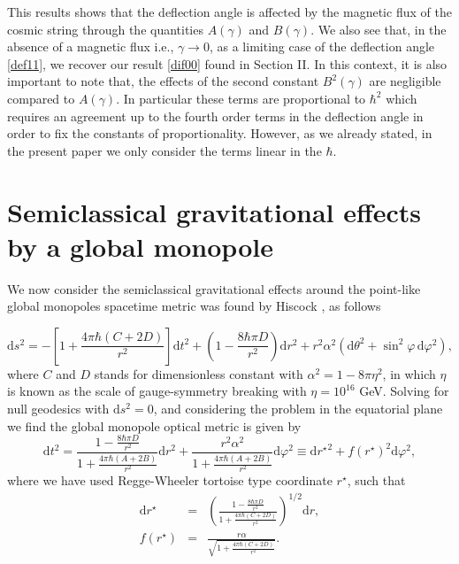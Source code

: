 \documentclass[preprint,superscriptaddress,amsfonts,amssymb,amsmath,showpacs]{revtex4}
\begin{document}
This results shows that the deflection angle is affected by the magnetic flux of the cosmic string through the quantities  $A(\gamma)$ and $B(\gamma)$. We also see that, in the absence of a magnetic flux i.e., $\gamma \to 0$, as a limiting case of the deflection angle \eqref{def11}, we recover our result \eqref{dif00} found in Section II.  In this context, it is also important to note that, the effects of the second constant $B^2(\gamma)$ are negligible compared to $A(\gamma)$. In particular these terms are proportional to $\hbar^2$ which requires an agreement up to the fourth order terms in the deflection angle in order to fix the constants of proportionality.  However, as we already stated, in the present paper we only consider the terms linear in the $\hbar$.


\section{Semiclassical gravitational effects by a global monopole}

We now consider the semiclassical gravitational effects around the point-like global monopoles spacetime metric was found by Hiscock \cite{Hiscock2}, as follows 

\begin{equation}\label{metric2}
\mathrm{d}s^2=-\left[1+\frac{4 \pi \hbar (C+2D) }{r^2}\right]\mathrm{d}t^2+\left(1-\frac{8 \hbar \pi D}{r^2}\right)\mathrm{d}r^2+r^2 \alpha^2 \left(\mathrm{d}\theta^2+\sin^2\varphi \,\mathrm{d}\varphi^2 \right),
\end{equation}
where $C$ and $D$ stands for dimensionless constant with $\alpha^2=1-8 \pi \eta^2$, in which $\eta$ is known as the scale of gauge-symmetry breaking with $\eta =10^{16}$ GeV. Solving for null geodesics with $\mathrm{d}s^2 =0$, and considering the problem in the equatorial plane we find the global monopole optical metric is given by
\begin{equation}\label{dt2}
\mathrm{d}t^{2}=\frac{1-\frac{8 \hbar \pi D}{r^2}}{1+\frac{4 \pi \hbar (A+2B) }{r^2}}\mathrm{d}r^2+\frac{r^2 \alpha^2}{1+\frac{4 \pi \hbar (A+2B) }{r^2}}\mathrm{d}\varphi^2 \equiv {\mathrm{d}r^{\star}}^2+f(r^{\star})^2 \mathrm{d}\varphi^2,
\end{equation}
where we have used Regge-Wheeler tortoise type coordinate $r^{\star }$, such that
\begin{eqnarray}
\mathrm{d}r^{\star }&=&\left(\frac{1-\frac{8 \hbar \pi D}{r^2}}{1+\frac{4 \pi \hbar (C+2D) }{r^2}}\right)^{1/2}\mathrm{d}r, \\
f(r^{\star })&=&\frac{r \alpha}{\sqrt{1+\frac{4 \pi \hbar (C+2D) }{r^2}}}.
\end{eqnarray}
\end{document}

